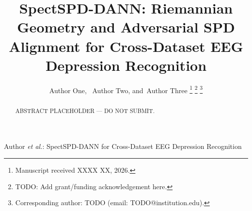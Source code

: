 \documentclass[journal]{IEEEtran}
\begin{document}
\title{%
  SpectSPD-DANN: Riemannian Geometry and Adversarial SPD Alignment
  for Cross-Dataset EEG Depression Recognition%
}

\author{%
  Author One,~
  Author Two,
  and~Author Three%
  \thanks{Manuscript received XXXX XX, 2026.}%
  \thanks{TODO: Add grant/funding acknowledgement here.}%
  \thanks{Corresponding author: TODO (email: TODO@institution.edu).}%
}

%
{Author \MakeLowercase{\textit{et al.}}: SpectSPD-DANN for Cross-Dataset EEG Depression Recognition}

\maketitle

\begin{abstract}
ABSTRACT PLACEHOLDER — DO NOT SUBMIT.
\end{abstract}
\end{document}
